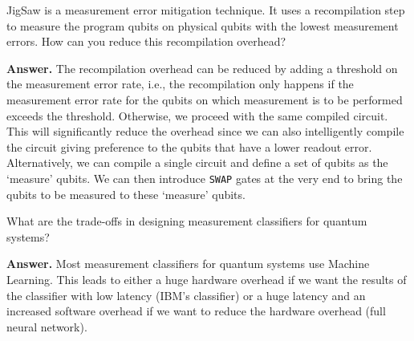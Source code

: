 \begin{question}
    JigSaw is a measurement error mitigation technique. It uses a recompilation step to measure the program qubits on physical qubits with the lowest measurement errors. How can you reduce this recompilation overhead?
\end{question}
\textbf{Answer.} The recompilation overhead can be reduced by adding a threshold on the measurement error rate, i.e., the recompilation only happens if the measurement error rate for the qubits on which measurement is to be performed exceeds the threshold. Otherwise, we proceed with the same compiled circuit. This will significantly reduce the overhead since we can also intelligently compile the circuit giving preference to the qubits that have a lower readout error. Alternatively, we can compile a single circuit and define a set of qubits as the `measure' qubits. We can then introduce \texttt{SWAP} gates at the very end to bring the qubits to be measured to these `measure' qubits.

\tcbline{}

\begin{question}
    What are the trade-offs in designing measurement classifiers for quantum systems?
\end{question}
\textbf{Answer.} Most measurement classifiers for quantum systems use Machine Learning. This leads to either a huge hardware overhead if we want the results of the classifier with low latency (IBM's classifier) or a huge latency and an increased software overhead if we want to reduce the hardware overhead (full neural network).